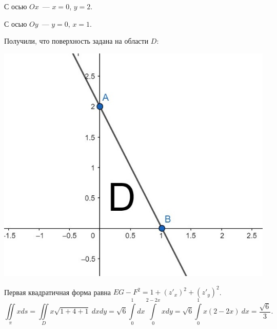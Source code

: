 \documentclass[../../main.tex]{subfiles}
\begin{document}
\begin{exmps}
\begin{enumerate}
	С осью $Ox$~--- $x = 0$, $y = 2$.
	
	С осью $Oy$~--- $y = 0$, $x = 1$.
	
	Получили, что поверхность задана на области $D$:
	
	\begin{center}
	 \includegraphics[scale = 0.2]{lec23-1.jpg}
	\end{center}

	Первая квадратичная форма равна $EG - F^2 = 1 + (z'_x)^2 + (z'_y)^2$.
	\[\iint \limits_\pi x ds = \iint \limits_D x \sqrt{1 + 4 +1} \  dx dy = 
	\sqrt{6}
	 \int \limits_0^1  dx \int \limits_0^{2 - 2x} x dy = \sqrt 6 \int \limits_0^1 
	 x(2 -2x) \ dx = \frac{\sqrt 6}{3}.\] 
	 \end{enumerate}
	\end{exmps}
\end{document}
